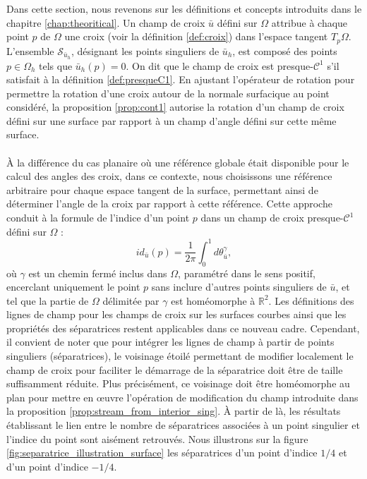 Dans cette section, nous revenons sur les définitions et concepts introduits dans le chapitre \ref{chap:theoritical}. Un champ de croix $\bar{u}$ défini sur $\Omega$ attribue à chaque point $p$ de $\Omega$ une croix (voir la définition \ref{def:croix}) dans l'espace tangent $T_p\Omega$. L'ensemble $\mathcal{S}_{\bar{u}_h}$, désignant les points singuliers de $\bar{u}_h$, est composé des points $p \in \Omega_h$ tels que $\bar{u}_h(p) = 0$. On dit que le champ de croix est presque-$\mathcal{C}^1$ s'il satisfait à la définition \ref{def:presqueC1}. En ajustant l'opérateur de rotation pour permettre la rotation d'une croix autour de la normale surfacique au point considéré, la proposition \ref{prop:cont1} autorise la rotation d'un champ de croix défini sur une surface par rapport à un champ d'angle défini sur cette même surface.\\\\
À la différence du cas planaire où une référence globale était disponible pour le calcul des angles des croix, dans ce contexte, nous choisissons une référence arbitraire pour chaque espace tangent de la surface, permettant ainsi de déterminer l'angle de la croix par rapport à cette référence. Cette approche conduit à la formule de l'indice d'un point $p$ dans un champ de croix presque-$\mathcal{C}^1$ défini sur $\Omega$ :
\begin{equation}
\label{eqn:index_surf}
id_{\bar{u}}(p) = \frac{1}{2\pi}\int_0^1 d\theta_{\bar{u}}^\gamma,
\end{equation}
où $\gamma$ est un chemin fermé inclus dans $\Omega$, paramétré dans le sens positif, encerclant uniquement le point $p$ sans inclure d'autres points singuliers de $\bar{u}$, et tel que la partie de $\Omega$ délimitée par $\gamma$ est homéomorphe à $\mathbb{R}^2$. Les définitions des lignes de champ pour les champs de croix sur les surfaces courbes ainsi que les propriétés des séparatrices restent applicables dans ce nouveau cadre. Cependant, il convient de noter que pour intégrer les lignes de champ à partir de points singuliers (séparatrices), le voisinage étoilé permettant de modifier localement le champ de croix pour faciliter le démarrage de la séparatrice doit être de taille suffisamment réduite. Plus précisément, ce voisinage doit être homéomorphe au plan pour mettre en œuvre l'opération de modification du champ introduite dans la proposition \ref{prop:stream_from_interior_sing}. À partir de là, les résultats établissant le lien entre le nombre de séparatrices associées à un point singulier et l'indice du point sont aisément retrouvés. Nous illustrons sur la figure \ref{fig:separatrice_illustration_surface} les séparatrices d'un point d'indice $1/4$ et d'un point d'indice $-1/4$.\\


